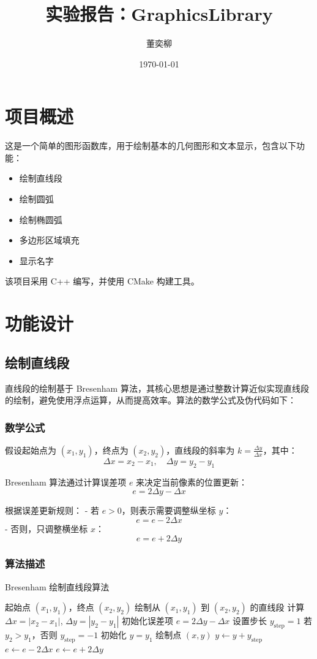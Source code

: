 \documentclass[11pt,a4paper]{article}
\title{实验报告：GraphicsLibrary}
\author{董奕柳}
\date{\today}
\begin{document}
\maketitle

\section{项目概述}
这是一个简单的图形函数库，用于绘制基本的几何图形和文本显示，包含以下功能：
\begin{itemize}
    \item 绘制直线段
    \item 绘制圆弧
    \item 绘制椭圆弧
    \item 多边形区域填充
    \item 显示名字
\end{itemize}

该项目采用 C++ 编写，并使用 CMake 构建工具。

\section{功能设计}

\subsection{绘制直线段}
直线段的绘制基于 Bresenham 算法，其核心思想是通过整数计算近似实现直线段的绘制，避免使用浮点运算，从而提高效率。算法的数学公式及伪代码如下：

\subsubsection{数学公式}
假设起始点为 \((x_1, y_1)\)，终点为 \((x_2, y_2)\)，直线段的斜率为 \(k = \frac{\Delta y}{\Delta x}\)，其中：
\[
\Delta x = x_2 - x_1, \quad \Delta y = y_2 - y_1
\]

Bresenham 算法通过计算误差项 \(e\) 来决定当前像素的位置更新：
\[
e = 2\Delta y - \Delta x
\]

根据误差更新规则：
- 若 \(e > 0\)，则表示需要调整纵坐标 \(y\)： 
\[
e = e - 2\Delta x
\]
- 否则，只调整横坐标 \(x\)： 
\[
e = e + 2\Delta y
\]

\subsubsection{算法描述}
\begin{algorithm}[H]
\caption{Bresenham 绘制直线段算法}
\begin{algorithmic}[1]
\Require 起始点 \((x_1, y_1)\)，终点 \((x_2, y_2)\)
\Ensure 绘制从 \((x_1, y_1)\) 到 \((x_2, y_2)\) 的直线段
\State 计算 \(\Delta x = |x_2 - x_1|\), \(\Delta y = |y_2 - y_1|\)
\State 初始化误差项 \(e = 2 \Delta y - \Delta x\)
\State 设置步长 \(y_{\text{step}} = 1\) 若 \(y_2 > y_1\)，否则 \(y_{\text{step}} = -1\)
\State 初始化 \(y = y_1\)
    \State 绘制点 \((x, y)\)
        \State \(y \gets y + y_{\text{step}}\)
        \State \(e \gets e - 2 \Delta x\)
    \EndIf
    \State \(e \gets e + 2 \Delta y\)
\EndFor
\end{algorithmic}
\end{algorithm}
\end{document}
